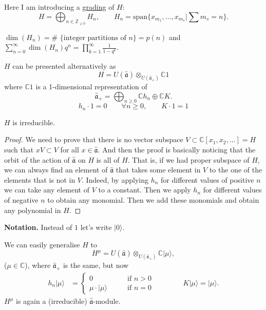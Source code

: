 Here I am introducing a \underline{grading} of $H$:
$$
H=\bigoplus_{n \in \mathbb{Z}_{\geq 0}}H_n,
\qquad H_n=\text{span}\{x_{m_1},\ldots,x_{m_s}|
\sum m_s=n\}.
$$

\begin{remark}
\label{remark-dimensions-are-number-of-partitions}
$\dim(H_n)=$\# $\{\text{integer partitions of }n\}=p(n)$ 
and $\sum_{n=0}^\infty \dim(H_n)q^n=\prod_{k=1}^\infty \frac{1}{1-q^k}$.
\end{remark}

\begin{remark}
\label{remark-Verma-module-style}
$H$ can be presented alternatively as
$$
H=U(\hat{\mathfrak{a}})\otimes_{U(\hat{\mathfrak{a}}_+)}\mathbb{C}1
$$
where $\mathbb{C}1$ is a 1-dimensional representation of
 $$
\hat{\mathfrak{a}}_+=\bigoplus_{n \geq 0}\mathbb{C}h_n \oplus\mathbb{C}K.
$$
$$
h_n \cdot 1=0\qquad \forall n \geq 0,\qquad K\cdot 1=1
$$
\end{remark}

\begin{exercise}
\label{exercise-H-is-irreducible}
$H$ is irreducible.
\end{exercise}

\begin{proof}
We need to prove that there is no
vector subspace $V \subset \mathbb{C}[x_1,x_2,\ldots]=H$
such that $xV \subset V$ for all $x \in \hat{\mathfrak{a}}$.
And then the proof is basically noticing 
that the orbit of the action of $\hat{\mathfrak{a}}$ on $H$ 
is all of $H$. That is, if we had proper subspace
of $H$, we can always find an element of $\hat{\mathfrak{a}}$ 
that takes some element in $V$ to the one of the
elements that is not in $V$. Indeed, by applying
$h_n$ for  different values of positive  $n$ we can take
any element of $V$ to a constant. Then we apply
$h_n$ for different values of negative $n$ to obtain
any monomial. Then we add these monomials and obtain any
polynomial in $H$.
\end{proof}

\noindent
{\bf Notation.} Instead of $1$ let's write $|0\rangle$.

\begin{remark}
\label{remark-generalise-H}
We can easily generalise $H$ to
$$
H^\mu=U(\hat{\mathfrak{a}}) \otimes_{U(\hat{\mathfrak{a}}_+)} \mathbb{C}
|\mu\rangle,
$$
($\mu \in \mathbb{C}$), where $\hat{\mathfrak{a}}_+$ is the same, but now
\begin{align*}
h_n |\mu\rangle&=\begin{cases}
0\qquad &\text{if }n>0 \\
\mu \cdot|\mu\rangle\qquad& \text{if }n=0
\end{cases}\qquad \qquad 
K|\mu\rangle=|\mu\rangle.
\end{align*}
$H^\mu$ is again a (irreducible) $\hat{\mathfrak{a}}$-module.
\end{remark}

